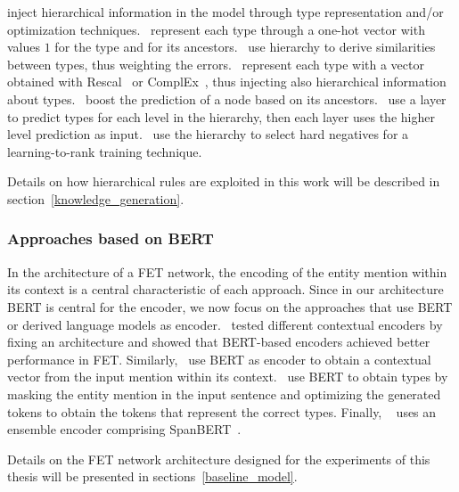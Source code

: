 \cite{ma-etal-2016-label,ren-etal-2016-afet,shimaoka2016neural,murty-etal-2018-hierarchical,xu-barbosa-2018-neural,lopez-etal-2019-fine,wu2019,ren2020FETHI,chen-etal-2020-hierarchical} inject hierarchical information in the model through type representation and/or optimization techniques.~\cite{ma-etal-2016-label,shimaoka2016neural} represent each type through a one-hot vector with values $1$ for the type and for its ancestors.~\cite{ren-etal-2016-afet,wu2019} use hierarchy to derive similarities between types, thus weighting the errors.~\cite{murty-etal-2018-hierarchical} represent each type with a vector obtained with Rescal~\cite{Nickel2011Rescal} or ComplEx~\cite{trouillon2016complex}, thus injecting also hierarchical information about types.~\cite{xu-barbosa-2018-neural} boost the prediction of a node based on its ancestors.~\cite{lopez-etal-2019-fine,ren2020FETHI} use a layer to predict types for each level in the hierarchy, then each layer uses the higher level prediction as input.~\cite{chen-etal-2020-hierarchical} use the hierarchy to select hard negatives for a learning-to-rank training technique.

Details on how hierarchical rules are exploited in this work will be described in section~\ref{knowledge_generation}.

\subsubsection{Approaches based on BERT}
In the architecture of a FET network, the encoding of the entity mention within its context is a central characteristic of each approach. Since in our architecture BERT is central for the encoder, we now focus on the approaches that use BERT or derived language models as encoder.~\cite{wang2020} tested different contextual encoders by fixing an architecture and showed that BERT-based encoders achieved better performance in FET. Similarly,~\cite{dai-etal-2020-semantic-relations,liu-etal-2021-fine,onoe-etal-2021-modeling} use BERT as encoder to obtain a contextual vector from the input mention within its context.~\cite{dai-etal-2021-ultra} use BERT to obtain types by masking the entity mention in the input sentence and optimizing the generated tokens to obtain the tokens that represent the correct types. Finally, ~\cite{Hou2021} uses an ensemble encoder comprising SpanBERT~\cite{joshi-etal-2020-spanbert}.

Details on the FET network architecture designed for the experiments of this thesis will be presented in sections~\ref{baseline_model}.
